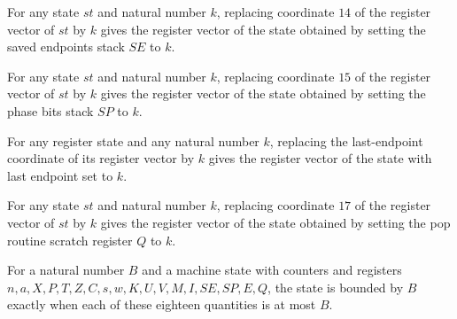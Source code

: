 \begin{lemma}
\label{Complexity.LogProg.SavitchARM.St.upd_SE}
\leanok
{}
For any state $st$ and natural number $k$, replacing coordinate $14$ of the register
vector of $st$ by $k$ gives the register vector of the state obtained by setting the
saved endpoints stack $SE$ to $k$.
\end{lemma}

\begin{lemma}
\label{Complexity.LogProg.SavitchARM.St.upd_SP}
\leanok
{}
For any state $st$ and natural number $k$, replacing coordinate $15$ of the register
vector of $st$ by $k$ gives the register vector of the state obtained by setting the
phase bits stack $SP$ to $k$.
\end{lemma}

\begin{lemma}
\label{Complexity.LogProg.SavitchARM.St.upd_E}
\leanok
{}
For any register state and any natural number $k$, replacing the last-endpoint
coordinate of its register vector by $k$ gives the register vector of the state with
last endpoint set to $k$.
\end{lemma}

\begin{lemma}
\label{Complexity.LogProg.SavitchARM.St.upd_Q}
\leanok
{}
For any state $st$ and natural number $k$, replacing coordinate $17$ of the register
vector of $st$ by $k$ gives the register vector of the state obtained by setting the pop
routine scratch register $Q$ to $k$.
\end{lemma}

\begin{definition}
\label{Complexity.LogProg.SavitchARM.St.Bd}
\leanok
{}
For a natural number $B$ and a machine state with counters and registers
$n,a,X,P,T,Z,C,s,w,K,U,V,M,I,SE,SP,E,Q$, the state is bounded by $B$ exactly when each
of these eighteen quantities is at most $B$.
\end{definition}

